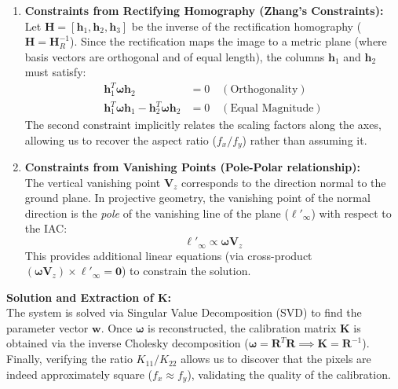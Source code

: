 \documentclass[a4paper,11pt]{article}
\newcommand{\matr}[1]{\bm{#1}}     %
\newcommand{\vect}[1]{\mathbf{#1}}  %
\begin{document}
\begin{enumerate}
    \item \textbf{Constraints from Rectifying Homography (Zhang's Constraints):} \\
    Let $\matr{H} = [\vect{h}_1, \vect{h}_2, \vect{h}_3]$ be the inverse of the rectification homography ($\matr{H} = \matr{H}_R^{-1}$). Since the rectification maps the image to a metric plane (where basis vectors are orthogonal and of equal length), the columns $\vect{h}_1$ and $\vect{h}_2$ must satisfy:
    \begin{align}
        \vect{h}_1^T \matr{\omega} \vect{h}_2 &= 0 \quad (\text{Orthogonality}) \\
        \vect{h}_1^T \matr{\omega} \vect{h}_1 - \vect{h}_2^T \matr{\omega} \vect{h}_2 &= 0 \quad (\text{Equal Magnitude})
    \end{align}
    The second constraint implicitly relates the scaling factors along the axes, allowing us to recover the aspect ratio ($f_x/f_y$) rather than assuming it.

    \item \textbf{Constraints from Vanishing Points (Pole-Polar relationship):} \\
    The vertical vanishing point $\vect{V}_z$ corresponds to the direction normal to the ground plane. In projective geometry, the vanishing point of the normal direction is the \textit{pole} of the vanishing line of the plane ($\vect{\ell}'_\infty$) with respect to the IAC:
    \begin{equation}
        \vect{\ell}'_\infty \propto \matr{\omega} \vect{V}_z
    \end{equation}
    This provides additional linear equations (via cross-product $(\matr{\omega} \vect{V}_z) \times \vect{\ell}'_\infty = \vect{0}$) to constrain the solution.
\end{enumerate}

\textbf{Solution and Extraction of K:} \\
The system is solved via Singular Value Decomposition (SVD) to find the parameter vector $\vect{w}$. Once $\matr{\omega}$ is reconstructed, the calibration matrix $\matr{K}$ is obtained via the inverse Cholesky decomposition ($\matr{\omega} = \matr{R}^T \matr{R} \implies \matr{K} = \matr{R}^{-1}$).
Finally, verifying the ratio $K_{11}/K_{22}$ allows us to discover that the pixels are indeed approximately square ($f_x \approx f_y$), validating the quality of the calibration.
\end{document}
